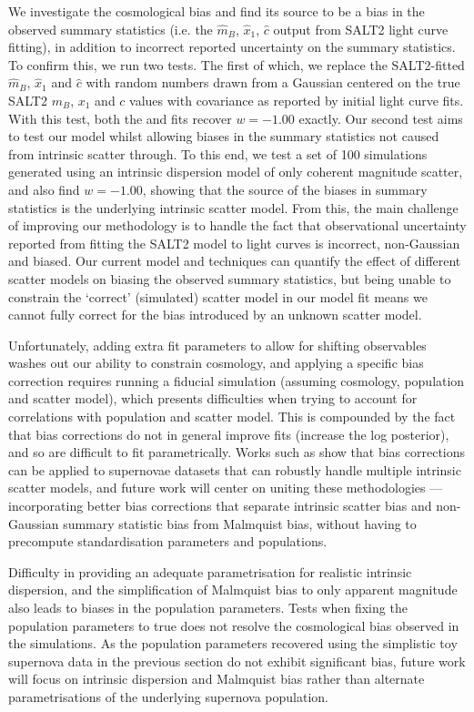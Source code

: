 \documentclass[a4paper,fleqn,usenatbib]{emulateapj}
\newcommand{\gten}{\citetalias{Guy2010}}
\newcommand{\celeven}{\citetalias{Chotard2011}}
\begin{document}
We investigate the cosmological bias and find its source to be a bias in the observed summary statistics (i.e. the $\hat{m}_B$, $\hat{x}_1$, $\hat{c}$ output from SALT2 light curve fitting), in addition to incorrect reported uncertainty on the summary statistics. To confirm this, we run two tests. The first of which, we replace the SALT2-fitted $\hat{m}_B$, $\hat{x}_1$ and $\hat{c}$ with random numbers drawn from a Gaussian centered on the true SALT2 $m_B$, $x_1$ and $c$ values with covariance as reported by initial light curve fits. With this test, both the {\gten} and {\celeven} fits recover $w=-1.00$ exactly. Our second test aims to test our model whilst allowing biases in the summary statistics not caused from intrinsic scatter through. To this end, we test a set of 100 simulations generated using an intrinsic dispersion model of only coherent magnitude scatter, and also find $w=-1.00$, showing that the source of the biases in summary statistics is the underlying intrinsic scatter model. From this, the main challenge of improving our methodology is to handle the fact that observational uncertainty reported from fitting the SALT2 model to light curves is incorrect, non-Gaussian and biased. Our current model and techniques can quantify the effect of different scatter models on biasing the observed summary statistics, but being unable to constrain the `correct' (simulated) scatter model in our model fit means we cannot fully correct for the bias introduced by an unknown scatter model. 

Unfortunately, adding extra fit parameters to allow for shifting observables washes out our ability to constrain cosmology, and applying a specific bias correction requires running a fiducial simulation (assuming cosmology, population and scatter model), which presents difficulties when trying to account for correlations with population and scatter model. This is compounded by the fact that bias corrections do not in general improve fits (increase the log posterior), and so are difficult to fit parametrically. Works such as \citet{Kessler2017} show that bias corrections can be applied to supernovae datasets that can robustly handle multiple intrinsic scatter models, and future work will center on uniting these methodologies --- incorporating better bias corrections that separate intrinsic scatter bias and non-Gaussian summary statistic bias from Malmquist bias, without having to precompute standardisation parameters and populations.

Difficulty in providing an adequate parametrisation for realistic intrinsic dispersion, and the simplification of Malmquist bias to only apparent magnitude also leads to biases in the population parameters. Tests when fixing the population parameters to true does not resolve the cosmological bias observed in the {\celeven} simulations. As the population parameters recovered using the simplistic toy supernova data in the previous section do not exhibit significant bias, future work will focus on intrinsic dispersion and Malmquist bias rather than alternate parametrisations of the underlying supernova population.
\end{document}
